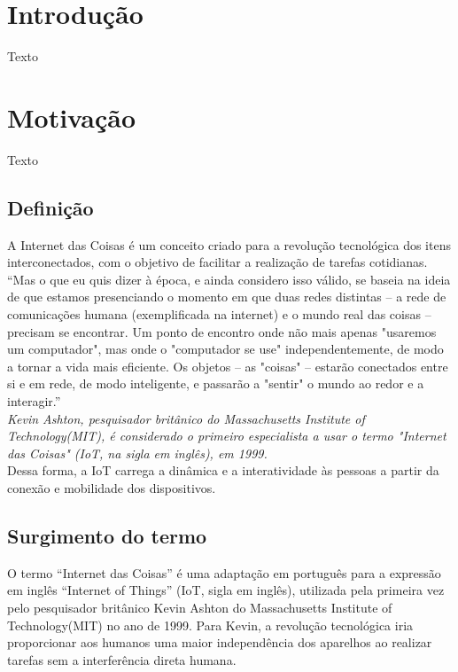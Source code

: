 \documentclass[11pt]{classe_cn}                 %
\begin{document}
\section{Introdução}
Texto

\section{Motivação}
Texto

\subsection{Definição} %
A Internet das Coisas é um conceito criado para a revolução tecnológica dos itens interconectados, 
com o objetivo de facilitar a realização de tarefas cotidianas.\\

“Mas o que eu quis dizer à época, e ainda considero isso válido, se baseia 
na ideia de que estamos presenciando o momento em que duas redes distintas – 
a rede de comunicações humana (exemplificada na internet) e o mundo real das coisas – 
precisam se encontrar. Um ponto de encontro onde não mais apenas "usaremos um 
computador", mas onde o "computador se use" independentemente, de modo a tornar a
vida mais eficiente. Os objetos – as "coisas" – estarão conectados entre si e em rede, 
de modo inteligente, e passarão a "sentir" o mundo ao redor e a interagir.”\\  

\textit{Kevin Ashton, pesquisador britânico do Massachusetts Institute of Technology(MIT), 
é considerado o primeiro especialista a usar o termo "Internet das Coisas" (IoT, na sigla em inglês), em 1999.}\\

Dessa forma, a IoT carrega a dinâmica e a interatividade às pessoas a partir 
da conexão e mobilidade dos dispositivos. 

\subsection{Surgimento do termo} %
O termo “Internet das Coisas” é uma adaptação em português para a expressão em 
inglês “Internet of Things” (IoT, sigla em inglês), utilizada pela primeira 
vez pelo pesquisador britânico Kevin Ashton do Massachusetts Institute of 
Technology(MIT) no ano de 1999. Para Kevin, a revolução tecnológica iria 
proporcionar aos humanos uma maior independência dos aparelhos ao realizar 
tarefas sem a interferência direta humana.\\
\end{document}

